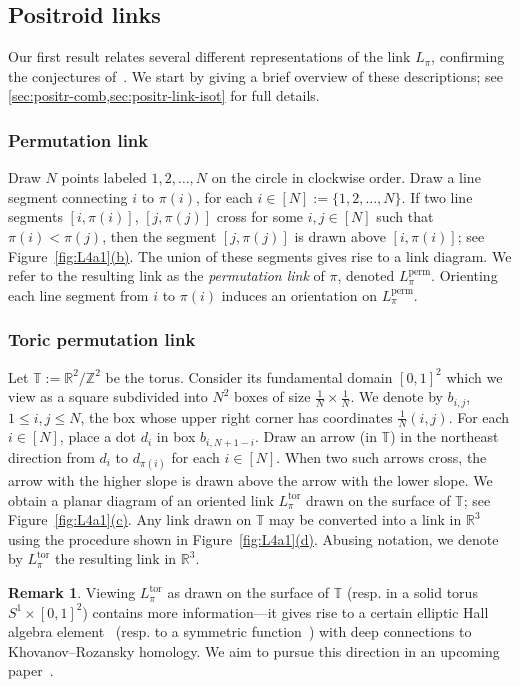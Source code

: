 \documentclass[11pt]{article}
\theoremstyle{definition}
\newtheorem{remark}[theo]{Remark}
\numberwithin{equation}{section}
\newcommand\R{\mathbb{R}}
\newcommand\Z{\mathbb{Z}}
\newcommand\perm{\operatorname{perm}}
\newcommand\Lperm{L^{\perm}}
\newcommand\tor{\operatorname{tor}}
\newcommand\Ltor{L^{\tor}}
\newcommand\fp{\pi}
\newcommand\T{\mathbb{T}}
\def\figref#1(#2){Figure~\hyperref[#1]{\ref*{#1}(#2)}}
\newcommand\n{N}
\begin{document}
\subsection{Positroid links} \label{sec:intro:positroid_links}

Our first result relates several different representations of the link $L_\fp$, confirming the conjectures of~\cite{GL_qtcat,GL_cat_combin}. We start by giving a brief overview of these descriptions; see \cref{sec:positr-comb,sec:positr-link-isot} for full details.

\subsubsection{Permutation link} \label{sec:intro:perm_links}
Draw $\n$ points labeled $1,2,\dots,\n$ on the circle in clockwise order. Draw a line segment connecting $i$ to $\fp(i)$, for each $i\in[\n]:=\{1,2,\dots,\n\}$. If two line segments $[i, \fp(i)]$, $[j,\fp(j)]$ cross for some $i,j\in[\n]$ such that $\fp(i)<\fp(j)$, then the segment $[j,\fp(j)]$ is drawn above $[i, \fp(i)]$; see \figref{fig:L4a1}(b). 
%
 The union of these segments gives rise to a link diagram. We refer to the resulting link as the \emph{permutation link} of $\fp$, denoted $\Lperm_\fp$. Orienting each line segment from $i$ to $\fp(i)$ induces an orientation on $\Lperm_\fp$.


\subsubsection{Toric permutation link}\label{sec:intro:tor_links} Let $\T:=\R^2/\Z^2$ be the torus. Consider its fundamental domain $[0,1]^2$ which we view as a square subdivided into $\n^2$ boxes of size $\frac1\n\times \frac1\n$. We denote by $b_{i,j}$, $1\leq i,j\leq \n$, the box whose upper right corner has coordinates $\frac1\n(i,j)$. For each $i\in[\n]$, place a dot $d_i$ in box $b_{i,\n+1-i}$. Draw an arrow (in $\T$) in the northeast direction from $d_i$ to $d_{\fp(i)}$ for each $i\in[\n]$. When two such arrows cross, the arrow with the higher slope is drawn above the arrow with the lower slope. We obtain a planar diagram of an oriented link $\Ltor_\fp$ drawn on the surface of $\T$; see \figref{fig:L4a1}(c). Any link drawn on $\T$ may be converted into a link in $\R^3$ using the procedure shown in \figref{fig:L4a1}(d). Abusing notation, we denote by $\Ltor_\fp$ the resulting link in $\R^3$.

\begin{remark}
Viewing $\Ltor_\fp$ as drawn on the surface of $\T$ (resp. in a solid torus $S^1\times [0,1]^2$) contains more information---it gives rise to a certain elliptic Hall algebra element~\cite{ScVa,BuSc} (resp. to a symmetric 
%
function~\cite{Turaev}) with deep connections to Khovanov--Rozansky homology. We aim to pursue this direction in an upcoming paper~\cite{GL_EHA}.
\end{remark}
%
%
\end{document}
